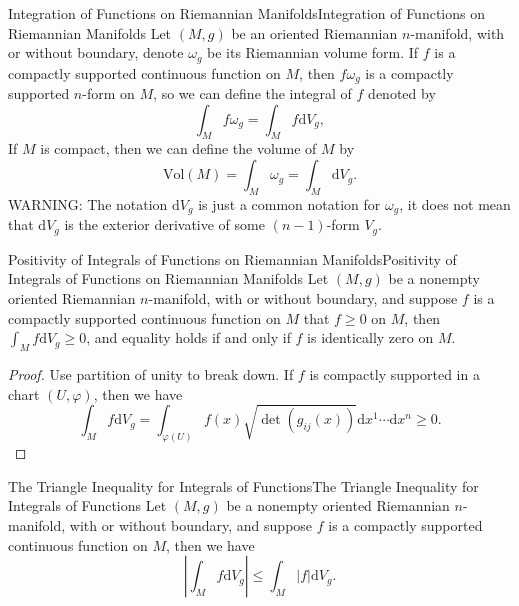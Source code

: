 \documentclass[../main.tex]{subfiles}
\begin{document}
\begin{definition}{Integration of Functions on Riemannian Manifolds}{Integration of Functions on Riemannian Manifolds}
  Let $(M,g)$ be an oriented Riemannian $n$-manifold, with or without boundary, denote $\omega_g$ be its Riemannian volume form. If $f$ is a compactly supported continuous function on $M$, then $f \omega_g$ is a compactly supported $n$-form on $M$, so we can define the integral of $f$ denoted by
  \begin{equation}
    \int_M f \omega_g = \int_M f \mathrm{d} V_g,
  \end{equation}
  If $M$ is compact, then we can define the volume of $M$ by
  \begin{equation}
    \mathrm{Vol}(M) = \int_M \omega_g = \int_M \mathrm{d} V_g.
  \end{equation}
  WARNING: The notation $\mathrm{d} V_g$ is just a common notation for $\omega_g$, it does not mean that $\mathrm{d} V_g$ is the exterior derivative of some $(n-1)$-form $V_g$.
\end{definition}

\begin{proposition}{Positivity of Integrals of Functions on Riemannian Manifolds}{Positivity of Integrals of Functions on Riemannian Manifolds}
  Let $(M,g)$ be a nonempty oriented Riemannian $n$-manifold, with or without boundary, and suppose $f$ is a compactly supported continuous function on $M$ that $f\geq 0$ on $M$, then $\displaystyle \int_M f \mathrm{d} V_g \geq 0$, and equality holds if and only if $f$ is identically zero on $M$.
\end{proposition}
\begin{proof}
  Use partition of unity to break down. If $f$ is compactly supported in a chart $(U,\varphi)$, then we have
  \begin{equation*}
    \int_M f \mathrm{d} V_g = \int_{\varphi(U)} f(x) \sqrt{\det (g_{ij}(x))} \mathrm{d} x^1 \cdots \mathrm{d} x^n \geq 0.
  \end{equation*}
\end{proof}

\begin{proposition}{The Triangle Inequality for Integrals of Functions}{The Triangle Inequality for Integrals of Functions}
  Let $(M,g)$ be a nonempty oriented Riemannian $n$-manifold, with or without boundary, and suppose $f$ is a compactly supported continuous function on $M$, then we have
  \begin{equation}
    \left| \int_M f \mathrm{d} V_g \right| \leq \int_M |f| \mathrm{d} V_g.
  \end{equation}
\end{proposition}
\end{document}
